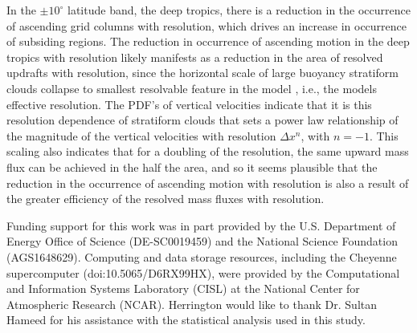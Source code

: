 \documentclass[times]{qjrms4}
\begin{document}
In the $\pm 10^{\circ}$ latitude band, the deep tropics, there is a reduction in the occurrence of ascending grid columns with resolution, which drives an increase in occurrence of subsiding regions. The reduction in occurrence of ascending motion in the deep tropics with resolution likely manifests as a reduction in the area of resolved updrafts with resolution, since the horizontal scale of large buoyancy stratiform clouds collapse to smallest resolvable feature in the model \citep{HR2018JAMES}, i.e., the models effective resolution. The PDF's of vertical velocities indicate that it is this resolution dependence of stratiform clouds that sets a power law relationship of the magnitude of the vertical velocities with resolution $\Delta x^{n}$, with $n=-1$. This scaling also indicates that for a doubling of the resolution, the same upward mass flux can be achieved in the half the area, and so it seems plausible that the reduction in the occurrence of ascending motion with resolution is also a result of the greater efficiency of the resolved mass fluxes with resolution.

\ack 
Funding support for this work was in part provided by the U.S. Department of Energy Office of Science (DE-SC0019459) and the National Science Foundation (AGS1648629). Computing and data storage resources, including the Cheyenne supercomputer (doi:10.5065/D6RX99HX), were provided by the Computational and Information Systems Laboratory (CISL) at the National Center for Atmospheric Research (NCAR). Herrington would like to thank Dr. Sultan Hameed for his assistance with the statistical analysis used in this study.



\end{document}
